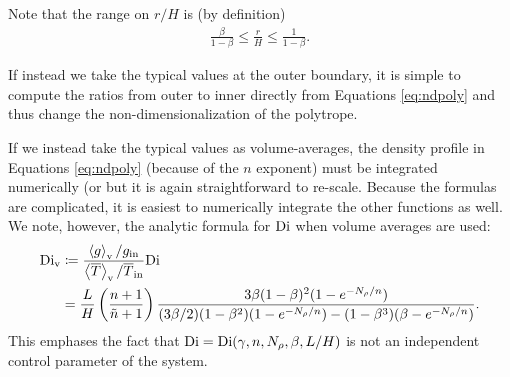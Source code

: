 \documentclass[12pt]{article}
\numberwithin{equation}{section}
\begin{document}
Note that the range on $r/H$ is (by definition)
\begin{align}
	\frac{\beta}{1-\beta}\leq \frac{r}{H} \leq \frac{1}{1-\beta}. 
\end{align}

If instead we take the typical values at the outer boundary, it is simple to compute the ratios from outer to inner directly from Equations \eqref{eq:ndpoly} and thus change the non-dimensionalization of the polytrope. 

If we instead take the typical values as volume-averages, the density profile in Equations \eqref{eq:ndpoly} (because of the $n$ exponent) must be integrated numerically (or but it is again straightforward to re-scale. Because the formulas are complicated, it is easiest to numerically integrate the other functions as well. We note, however, the analytic formula for ${\rm{Di}}$ when volume averages are used: 
\begin{align}\label{eq:digory}
	{\rm{Di}}_{\rm{v}} &\coloneqq \frac{\left\langle g\right\rangle_{\rm{v}}/g_{\rm{in}}}{\left\langle\overline{T}\right\rangle_{\rm{v}}/\overline{T}_{\rm{in}}}{\rm{Di}} \nonumber\\
	&= \frac{L}{H}\left(\frac{n+1}{\tilde{n}+1}\right)   \frac{3 \beta (1 - \beta)^2 (1 - e^{-N_\rho/n})} 
	{ (3\beta/2) (1 - \beta^2) (1 - e^{-N_\rho/n}) - (1-\beta^3)(\beta-e^{-N_\rho/n})}. 
\end{align}
This emphases the fact that ${\rm{Di}}={\rm{Di}}(\gamma,n,N_\rho,\beta,L/H)$ is not an independent control parameter of the system. 
\end{document}
